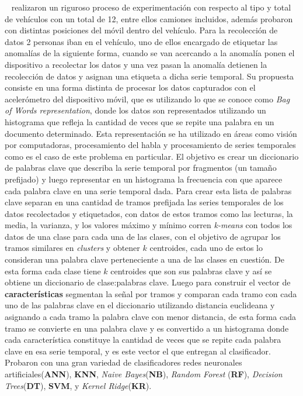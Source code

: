 		~ realizaron un riguroso proceso de experimentación con respecto al tipo y total de vehículos con
		un total de 12, entre ellos camiones incluidos, además probaron con distintas posiciones del móvil dentro del vehículo. Para la recolección de datos 2
		personas iban en el vehículo, uno de ellos encargado de etiquetar las anomalías de la siguiente forma, cuando se van acercando a la anomalía ponen el
		dispositivo a recolectar los datos y una vez pasan la anomalía detienen la recolección de datos y asignan una etiqueta a dicha serie temporal. Su
		propuesta consiste en una forma distinta de procesar los datos capturados con el acelerómetro del dispositivo móvil, que es utilizando lo que se conoce
		como \emph{Bag of Words representation}, donde los datos son representados utilizando un histograma que refleja la cantidad de veces que se repite una
		palabra en un documento determinado. Esta representación se ha utilizado en áreas como visión por computadoras, procesamiento del habla y procesamiento
		de series temporales como es el caso de este problema en particular. El objetivo es crear un diccionario de palabras clave que describa la serie temporal
		por fragmentos (un tamaño prefijado) y luego representar en un histograma la frecuencia con que aparece cada palabra clave en una serie temporal dada.
		Para crear esta lista de palabras clave separan en una cantidad de tramos prefijada las series temporales de los datos recolectados y etiquetados, con
		datos de estos tramos como las lecturas, la media, la varianza, y los valores máximo y mínimo corren \emph{k-means} con todos los datos de una clase para
		cada una de las clases, con el objetivo de agrupar los tramos similares en \emph{clusters} y obtener $k$ centroides, cada uno de estos lo consideran una
		palabra clave perteneciente a una de las clases en cuestión. De esta forma cada clase tiene $k$ centroides que son sus palabras clave y así se obtiene 
		un diccionario de clase:palabras clave. Luego para construir el vector de \textbf{características} segmentan la señal por tramos y comparan cada tramo con cada
		uno de las palabras clave en el diccionario utilizando distancia euclideana y asignando a cada tramo la palabra clave con menor distancia, de esta forma
		cada tramo se convierte en una palabra clave y es convertido a un histograma donde cada característica constituye la cantidad de veces que se repite cada
		palabra clave en esa serie temporal, y es este vector el que entregan al clasificador. Probaron con una gran variedad de clasificadores redes neuronales
		artificiales(\textbf{ANN}), \textbf{KNN}, \emph{Naive Bayes}(\textbf{NB}), \emph{Random Forest} (\textbf{RF}), \emph{Decision Trees}(\textbf{DT}),
		\textbf{SVM}, y \emph{Kernel Ridge}(\textbf{KR}).\\

